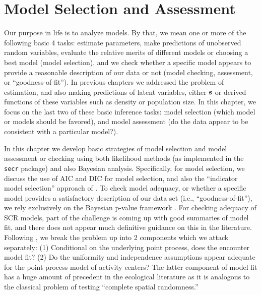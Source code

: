 \chapter{
Model Selection and Assessment
}
\label{chapt.gof}

\vspace{.3in}

Our purpose in life is to analyze models. By that, we mean one or more
of the following basic 4 tasks: estimate parameters, make predictions
of unobserved random variables, evaluate the
relative merits of different models or choosing a best model (model
selection), and we check whether a specific model appears to provide a
reasonable description of our data or not (model checking, assessment,
or ``goodness-of-fit'').  In previous chapters we
addressed the problem of estimation, %
and also making
predictions of latent variables, either ${\bf s}$ or
derived functions of these variables such as density or population size.
In this chapter, we focus on the last two of these basic
inference tasks: model selection (which model or models should be
favored), and model assessment (do the data appear to be consistent
with a particular model?).


In this chapter we develop basic strategies of model selection and
model assessment or checking using both likelihood methods (as
implemented in the \mbox{\tt secr} package) and also Bayesian
analysis.
Specifically, for model selection, we discuss the use of AIC and DIC for model
selection, and also the ``indicator model selection'' approach of
\citet{kuo_mallick:1998}.  To check model adequacy, or whether a
specific model provides a satisfactory description of our data set
(i.e., ``goodness-of-fit''), we rely exclusively on the Bayesian
p-value framework \citep{gelman_etal:1996}.  For checking adequacy of
SCR models, part of the challenge is coming up with good summaries of
model fit, and there does not appear much definitive guidance on this
in the literature.  Following \citet{royle_etal:2011mee}, we break the
problem up into 2 components which we attack separately: (1)
Conditional on the underlying point process, does the encounter model
fit? (2) Do the uniformity and independence assumptions appear
adequate for the point process model of activity centers? The latter
component of model fit has a huge amount of precedent in the
ecological literature as it is analogous to the classical problem of
testing ``complete spatial randomness.''

